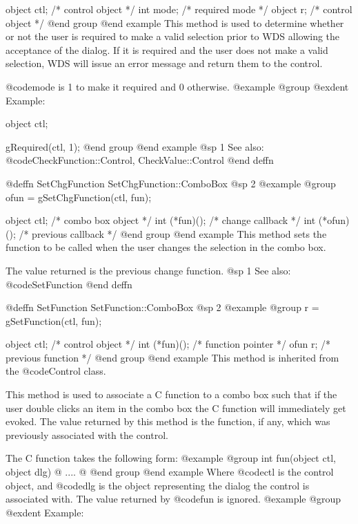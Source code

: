 {object  ctl;    /*  control object  */
int     mode;   /*  required mode   */
object  r;      /*  control object  */
@end group
@end example
This method is used to determine whether or not the user is required to
make a valid selection prior to WDS allowing the acceptance of the dialog.
If it is required and the user does not make a valid selection, WDS
will issue an error message and return them to the control.

@code{mode} is 1 to make it required and 0 otherwise.
@example
@group
@exdent Example:

object  ctl;

gRequired(ctl, 1);
@end group
@end example
@sp 1
See also:  @code{CheckFunction::Control, CheckValue::Control}
@end deffn



@deffn {SetChgFunction} SetChgFunction::ComboBox
@sp 2
@example
@group
ofun = gSetChgFunction(ctl, fun);

object  ctl;         /*  combo box object     */
int     (*fun)();    /*  change callback      */
int     (*ofun)();   /*  previous callback    */
@end group
@end example
This method sets the function to be called when the user changes the
selection in the combo box.

The value returned is the previous change function.
@sp 1
See also:  @code{SetFunction}
@end deffn



















@deffn {SetFunction} SetFunction::ComboBox
@sp 2
@example
@group
r = gSetFunction(ctl, fun);

object  ctl;      /*  control object           */
int     (*fun)(); /*  function pointer         */
ofun    r;        /*  previous function        */
@end group
@end example
This method is inherited from the @code{Control} class.

This method is used to associate a C function to a combo box such that if
the user double clicks an item in the combo box the C function will
immediately get evoked.  The value returned by this method is the
function, if any, which was previously associated with the control.

The C function takes the following form:
@example
@group
int     fun(object ctl, object dlg)
@{
        ....
@}
@end group
@end example
Where @code{ctl} is the control object, and @code{dlg} is the object
representing the dialog the control is associated with.  The value
returned by @code{fun} is ignored.
@example
@group
@exdent Example:

}
